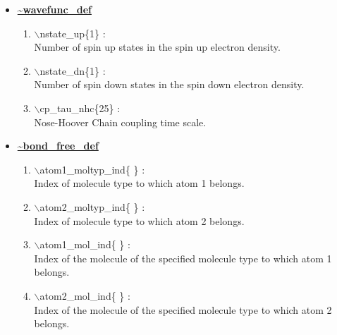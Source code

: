 \begin{itemize}
\begin{enumerate}
\end{enumerate}

\clearpage
\huge
\item[] \underline{\bf \~{}wavefunc\_def}
\begin{enumerate}


 \vspace{0.15in} \Large
 \item  $\backslash$nstate\_up\{1\} : \\ 
    \large
     Number of spin up states in the spin up electron density.

 \vspace{0.15in} \Large
 \item  $\backslash$nstate\_dn\{1\} : \\
    \large
     Number of spin down states in the spin down electron density.

 \vspace{0.15in} \Large
 \item  $\backslash$cp\_tau\_nhc\{25\} : \\
    \large
     Nose-Hoover Chain coupling time scale.

\end{enumerate}

\clearpage
\huge
\item[] \underline{\bf \~{}bond\_free\_def}
\begin{enumerate}

 \vspace{0.15in} \Large
 \item  $\backslash$atom1\_moltyp\_ind\{ \} : \\ 
    \large
    Index of molecule type to which atom 1 belongs.

 \vspace{0.15in} \Large
 \item  $\backslash$atom2\_moltyp\_ind\{ \} : \\ 
    \large
    Index of molecule type to which atom 2 belongs.

 \vspace{0.15in} \Large
 \item  $\backslash$atom1\_mol\_ind\{ \} : \\    
    \large
    Index of the molecule of the specified molecule type 
    to which atom 1 belongs.

 \vspace{0.15in} \Large
 \item  $\backslash$atom2\_mol\_ind\{ \} : \\    
    \large
    Index of the molecule of the specified molecule type 
    to which atom 2 belongs.


\end{enumerate}
\end{itemize}
